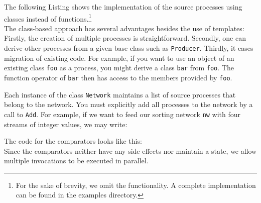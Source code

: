 The following Listing shows the implementation of the source processes using classes instead of functions.\footnote{For the sake of brevity, we omit the functionality. A complete implementation can be found in the examples directory.}
%
\\
%
The class-based approach has several advantages besides the use of templates: Firstly, the creation of multiple processes is straightforward. Secondly, one can derive other processes from a given base class such as \lstinline|Producer|. Thirdly, it eases migration of existing code. For example, if you want to use an object of an existing class \lstinline|foo| as a process, you might derive a class \lstinline|bar| from \lstinline|foo|. The function operator of \lstinline|bar| then has access to the members provided by \lstinline|foo|.

Each instance of the class \lstinline|Network| maintains a list of source processes that belong to the network.
You must explicitly add all processes to the network by a call to \lstinline|Add|. For example, if we want to feed our sorting network \lstinline|nw| with four streams of integer values, we may write:
%
\\
%

The code for the comparators looks like this:
%
\\
%
Since the comparators neither have any side effects nor maintain a state, we allow multiple invocations to be executed in parallel.

